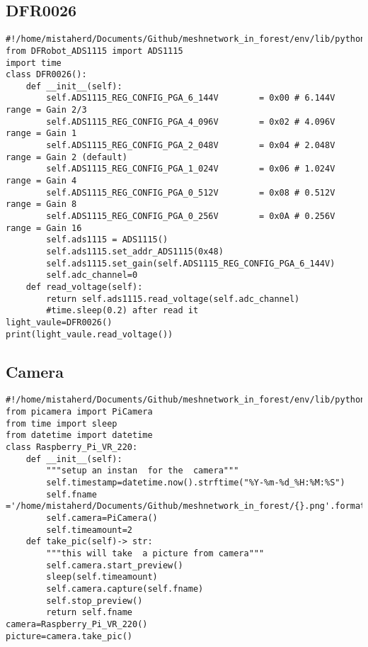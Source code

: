 \subsection{DFR0026}
\begin{lstlisting}[style=mystyle,caption={Code for  DFR00026}]
#!/home/mistaherd/Documents/Github/meshnetwork_in_forest/env/lib/python3.11
from DFRobot_ADS1115 import ADS1115
import time
class DFR0026():
    def __init__(self):
        self.ADS1115_REG_CONFIG_PGA_6_144V        = 0x00 # 6.144V range = Gain 2/3
        self.ADS1115_REG_CONFIG_PGA_4_096V        = 0x02 # 4.096V range = Gain 1
        self.ADS1115_REG_CONFIG_PGA_2_048V        = 0x04 # 2.048V range = Gain 2 (default)
        self.ADS1115_REG_CONFIG_PGA_1_024V        = 0x06 # 1.024V range = Gain 4
        self.ADS1115_REG_CONFIG_PGA_0_512V        = 0x08 # 0.512V range = Gain 8
        self.ADS1115_REG_CONFIG_PGA_0_256V        = 0x0A # 0.256V range = Gain 16
        self.ads1115 = ADS1115()
        self.ads1115.set_addr_ADS1115(0x48)
        self.ads1115.set_gain(self.ADS1115_REG_CONFIG_PGA_6_144V)
        self.adc_channel=0
    def read_voltage(self):
        return self.ads1115.read_voltage(self.adc_channel)
        #time.sleep(0.2) after read it
light_vaule=DFR0026()
print(light_vaule.read_voltage())  

\end{lstlisting}
\newpage
\subsection{Camera}
\begin{lstlisting}[style=mystyle,caption={Code for Camera}]
#!/home/mistaherd/Documents/Github/meshnetwork_in_forest/env/lib/python3.11
from picamera import PiCamera
from time import sleep
from datetime import datetime
class Raspberry_Pi_VR_220:
    def __init__(self):
        """setup an instan  for the  camera"""
        self.timestamp=datetime.now().strftime("%Y-%m-%d_%H:%M:%S")
        self.fname ='/home/mistaherd/Documents/Github/meshnetwork_in_forest/{}.png'.format(self.timestamp)
        self.camera=PiCamera()
        self.timeamount=2
    def take_pic(self)-> str:
        """this will take  a picture from camera"""
        self.camera.start_preview()
        sleep(self.timeamount)
        self.camera.capture(self.fname)
        self.stop_preview()
        return self.fname
camera=Raspberry_Pi_VR_220()
picture=camera.take_pic()
\end{lstlisting}
\newpage 

